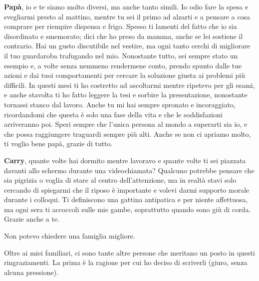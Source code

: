 \textbf{Papà}, io e te siamo molto diversi, ma anche tanto simili. Io odio fare la spesa e svegliarmi presto al mattino, mentre tu sei il primo ad alzarti e a pensare a cosa comprare per riempire dispensa e frigo. Spesso ti lamenti del fatto che io sia disordinato e smemorato; dici che ho preso da mamma, anche se lei sostiene il contrario. Hai un gusto discutibile nel vestire, ma ogni tanto cerchi di migliorare il tuo guardaroba trafugando nel mio. Nonostante tutto, sei sempre stato un esempio e, a volte senza nemmeno rendermene conto, prendo spunto dalle tue azioni e dai tuoi comportamenti per cercare la soluzione giusta ai problemi più difficili. In questi mesi ti ho costretto ad ascoltarmi mentre ripetevo per gli esami, e anche stavolta ti ho fatto leggere la tesi e sorbire la presentazione, nonostante tornassi stanco dal lavoro. Anche tu mi hai sempre spronato e incoraggiato, ricordandomi che questa è solo una fase della vita e che le soddisfazioni arriveranno poi. Speri sempre che l'unica persona al mondo a superarti sia io, e che possa raggiungere traguardi sempre più alti. Anche se non ci apriamo molto, ti voglio bene papà, grazie di tutto.

\textbf{Carry}, quante volte hai dormito mentre lavoravo e quante volte ti sei piazzata davanti allo schermo durante una videochiamata? Qualcuno potrebbe pensare che sia pigrizia o voglia di stare al centro dell'attenzione, ma in realtà stavi solo cercando di spiegarmi che il riposo è importante e volevi darmi supporto morale durante i colloqui. Ti definiscono una gattina antipatica e per niente affettuosa, ma ogni sera ti accoccoli sulle mie gambe, soprattutto quando sono giù di corda. Grazie anche a te.

Non potevo chiedere una famiglia migliore.

Oltre ai miei familiari, ci sono tante altre persone che meritano un posto in questi ringraziamenti. La prima è la ragione per cui ho deciso di scriverli (giuro, senza alcuna pressione).

